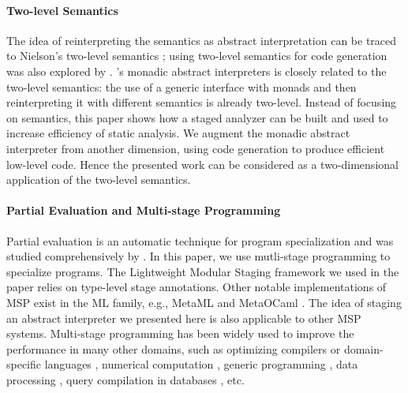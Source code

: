 \paragraph{Two-level Semantics} The idea of reinterpreting the semantics as
abstract interpretation can be traced to Nielson's two-level semantics
\cite{NIELSON1989117}; using two-level semantics for code generation
was also explored by \citet{NIELSON198859}.
\citet{Sergey:2013:MAI:2491956.2491979}'s monadic abstract
interpreters is closely related to the two-level semantics: the
use of a generic interface with monads and then reinterpreting it with
different semantics is already two-level. Instead of focusing on
semantics, this paper shows how a staged analyzer can be built and
used to increase efficiency of static analysis. We augment the monadic
abstract interpreter from another dimension, using code generation to
produce efficient low-level code. Hence the presented work can be
considered as a two-dimensional application of the two-level semantics.

\paragraph{Partial Evaluation and Multi-stage Programming}
Partial evaluation is an automatic technique for program
specialization and was studied comprehensively by
\citet{10.1007/3-540-61580-6_11, DBLP:books/daglib/0072559}.
In this paper, we use mutli-stage programming to specialize programs.
The Lightweight Modular Staging framework
\cite{DBLP:conf/gpce/RompfO10} we used in the paper relies on
type-level stage annotations.  Other notable implementations of MSP
exist in the ML family, e.g., MetaML \cite{DBLP:conf/pepm/TahaS97} and
MetaOCaml \cite{DBLP:conf/gpce/CalcagnoTHL03,
  DBLP:conf/flops/Kiselyov14}.
The idea of staging an abstract interpreter we presented here
is also applicable to other MSP systems.
Multi-stage programming has been widely used to improve the
performance in many other domains, such as optimizing compilers or
domain-specific languages \cite{DBLP:conf/pldi/RompfSBLCO14,
  DBLP:conf/snapl/RompfBLSJAOSKDK15,
  DBLP:journals/tecs/SujeethBLRCOO14, DBLP:conf/gpce/SujeethGBLROO13,
  DBLP:journals/jfp/CaretteKS09}, numerical computation \cite{PGL-038,
  DBLP:conf/pepm/AktemurKKS13}, generic programming
\cite{DBLP:journals/pacmpl/Yallop17,
  Ofenbeck:2017:SGP:3136040.3136060}, data processing
\cite{DBLP:conf/oopsla/JonnalageddaCSRO14,
  DBLP:conf/popl/KiselyovBPS17}, query compilation in databases
\cite{DBLP:conf/osdi/EssertelTDBOR18, DBLP:conf/sigmod/TahboubER18},
etc.

